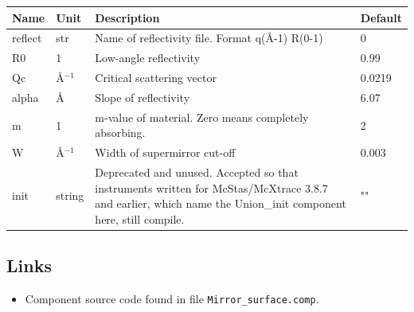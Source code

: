 \begin{longtable}{p{}p{}p{}p{}}
\toprule
\textbf{Name} & \textbf{Unit} & \textbf{Description} & \textbf{Default} \\
\midrule
\endhead
reflect & str & Name of reflectivity file. Format q(\AA{}-1) R(0-1) & 0 \\
R0 & 1 & Low-angle reflectivity & 0.99 \\
Qc & \AA{}$^{-1}$ & Critical scattering vector & 0.0219 \\
alpha & \AA{} & Slope of reflectivity & 6.07 \\
m & 1 & m-value of material. Zero means completely absorbing. & 2 \\
W & \AA{}$^{-1}$ & Width of supermirror cut-off & 0.003 \\
init & string & Deprecated and unused. Accepted so that instruments written for McStas/McXtrace 3.8.7 and earlier, which name the Union\_init component here, still compile. & "" \\
\bottomrule
\end{longtable}

\subsection*{Links}
\begin{itemize}
  \item Component source code found in file \texttt{Mirror\_surface.comp}.
\end{itemize}
